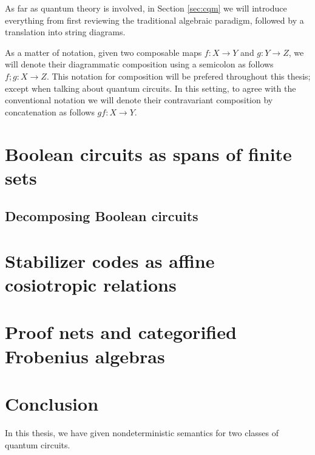 \documentclass[12pt]{ociamthesis}  %
\begin{document}
As far as quantum theory is involved, in Section \ref{sec:cqm} we will introduce everything from first reviewing the traditional algebraic paradigm, followed by a translation into string diagrams.

As a matter of notation, given two composable maps $f:X\to Y$ and $g:Y \to Z$, we will denote their diagrammatic composition using a semicolon as follows $f;g:X\to Z$. This notation for composition will be prefered throughout this thesis; except when talking about quantum circuits.  In this setting, to agree with the conventional notation we will denote their contravariant composition by concatenation as follows $gf:X\to Y$.





\chapter{Boolean circuits as spans of finite sets}
\label{chap:zxa}


\section{Decomposing Boolean circuits}
\label{sec:dist}


\chapter{Stabilizer codes as affine cosiotropic relations}
\label{chap:stab}


\chapter{Proof nets and categorified Frobenius algebras}
\label{chap:grothendieck}


\chapter{Conclusion}
\label{chap:conclusion}


In this thesis, we have given nondeterministic semantics for two classes of quantum circuits.  
\end{document}
